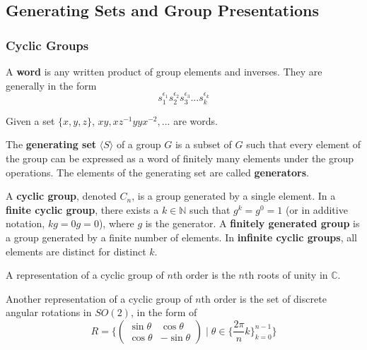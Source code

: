 \documentclass{article}
\begin{document}
  \subsection{Generating Sets and Group Presentations}

    \subsubsection{Cyclic Groups}

      \begin{definition}
        A \textbf{word} is any written product of group elements and inverses. They are generally in the form
        \begin{equation}
          s_{1}^{\epsilon_{1}} s_{2}^{\epsilon_{2}} s_{3}^{\epsilon_{3}}... s_{k}^{\epsilon_{k}}
        \end{equation}
      \end{definition}

      \begin{example}
        Given a set $\{x,y,z\}$, $x y, x z^{-1} y y x^{-2},...$ are words. 
      \end{example}

      \begin{definition}
        The \textbf{generating set} $\langle S \rangle$ of a group $G$ is a subset of $G$ such that every element of the group can be expressed as a word of finitely many elements under the group operations. The elements of the generating set are called \textbf{generators}.
      \end{definition}

      \begin{definition}
        A \textbf{cyclic group}, denoted $C_{n}$, is a group generated by a single element. In a \textbf{finite cyclic group}, there exists a $k \in \mathbb{N}$ such that $g^{k} = g^{0} = 1$ (or in additive notation, $kg = 0g = 0$), where $g$ is the generator. A \textbf{finitely generated group} is a group generated by a finite number of elements. In \textbf{infinite cyclic groups}, all elements are distinct for distinct $k$. 
      \end{definition}

      \begin{example}
        A representation of a cyclic group of $n$th order is the $n$th roots of unity in $\mathbb{C}$.
      \end{example}

      \begin{example}
        Another representation of a cyclic group of $n$th order is the set of discrete angular rotations in $SO(2)$, in the form of 
        \begin{equation}
          R =  \bigg\{ \begin{pmatrix}
          \sin{\theta} & \cos{\theta} \\
          \cos{\theta} & -\sin{\theta}
          \end{pmatrix}\; \bigg| \; \theta \in \Big\{\frac{2 \pi}{n} k\Big\}_{k = 0}^{n-1} \bigg\}
        \end{equation}
      \end{example}
\end{document}
